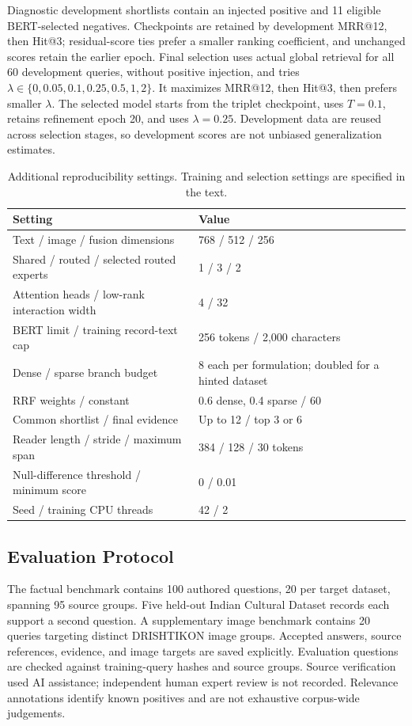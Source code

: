 \documentclass[10pt,a4paper]{article}
\begin{document}
Diagnostic development shortlists contain an injected positive and 11 eligible BERT-selected negatives. Checkpoints are retained by development MRR@12, then Hit@3; residual-score ties prefer a smaller ranking coefficient, and unchanged scores retain the earlier epoch. Final selection uses actual global retrieval for all 60 development queries, without positive injection, and tries $\lambda\in\{0,0.05,0.1,0.25,0.5,1,2\}$. It maximizes MRR@12, then Hit@3, then prefers smaller $\lambda$. The selected model starts from the triplet checkpoint, uses $T=0.1$, retains refinement epoch 20, and uses $\lambda=0.25$. Development data are reused across selection stages, so development scores are not unbiased generalization estimates.

\begin{table}[htbp]
\centering\small
\caption{Additional reproducibility settings. Training and selection settings are specified in the text.}
\label{tab:settings}
\begin{tabularx}{\linewidth}{@{}lX@{}}
\toprule Setting & Value\\\midrule
Text / image / fusion dimensions & 768 / 512 / 256\\
Shared / routed / selected routed experts & 1 / 3 / 2\\
Attention heads / low-rank interaction width & 4 / 32\\
BERT limit / training record-text cap & 256 tokens / 2,000 characters\\
Dense / sparse branch budget & 8 each per formulation; doubled for a hinted dataset\\
RRF weights / constant & 0.6 dense, 0.4 sparse / 60\\
Common shortlist / final evidence & Up to 12 / top 3 or 6\\
Reader length / stride / maximum span & 384 / 128 / 30 tokens\\
Null-difference threshold / minimum score & 0 / 0.01\\
Seed / training CPU threads & 42 / 2\\\bottomrule
\end{tabularx}
\end{table}

\subsection{Evaluation Protocol}
The factual benchmark contains 100 authored questions, 20 per target dataset, spanning 95 source groups. Five held-out Indian Cultural Dataset records each support a second question. A supplementary image benchmark contains 20 queries targeting distinct DRISHTIKON image groups. Accepted answers, source references, evidence, and image targets are saved explicitly. Evaluation questions are checked against training-query hashes and source groups. Source verification used AI assistance; independent human expert review is not recorded. Relevance annotations identify known positives and are not exhaustive corpus-wide judgements.
\end{document}
